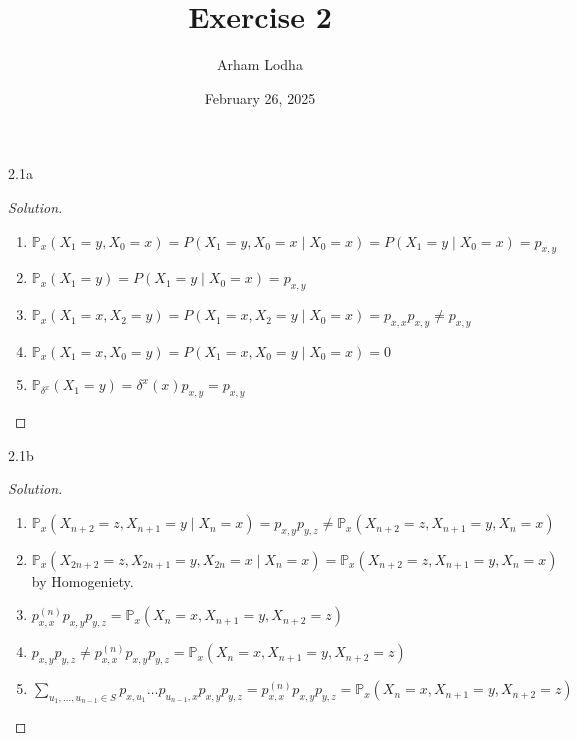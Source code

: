 \documentclass{article}
\newcommand{\PR}{\mathbb{P}}
\newenvironment{solution}
{\renewcommand\qedsymbol{$\blacksquare$}\begin{proof}[Solution]}
{\end{proof}}
\begin{document}
\title{Exercise 2}
\author{Arham Lodha}%
\date{February 26, 2025}%
\maketitle

\begin{PROB}{2.1a}\label{Problem 2.1a.}
\end{PROB}
\begin{solution}
    \begin{enumerate}
        \item $\PR_x(X_1 = y, X_0 = x) = P(X_1 = y, X_0 = x \mid X_0 = x) = P(X_1 = y \mid X_0 = x) = p_{x, y}$
        \item $\PR_x(X_1 = y) = P(X_1 = y \mid X_0 = x) = p_{x, y}$
        \item $\PR_x(X_1 = x, X_2 = y) = P(X_1 = x, X_2 =y \mid X_0 = x) = p_{x, x} p_{x, y} \neq p_{x, y}$
        \item $\PR_{x}(X_1 = x, X_0 = y) = P(X_1 = x, X_0 = y \mid X_0 = x) = 0$
        \item $\PR_{\delta^x}(X_1 = y) = \delta^x(x) p_{x, y} = p_{x, y}$ 
    \end{enumerate}
    
    
\end{solution}
\begin{PROB}{2.1b}\label{Problem 2.1b.}
\end{PROB}
\begin{solution}
    \begin{enumerate}
        \item $\PR_x(X_{n + 2} = z , X_{n + 1}= y \mid X_n = x) = p_{x, y} p_{y, z} \neq \PR_x(X_{n + 2} = z, X_{n + 1} = y, X_{n} = x)$ 
        \item $\PR_x(X_{2n + 2} = z, X_{2n + 1} = y, X_{2n} = x \mid X_{n} = x) = \PR_x(X_{n + 2} = z, X_{n + 1} = y, X_{n} = x)$ by Homogeniety. 
        \item $p^{(n)}_{x, x}p_{x, y}p_{y, z} = \PR_x(X_n = x, X_{n + 1} = y, X_{n + 2}= z)$
        \item $p_{x, y} p_{y, z} \neq p^{(n)}_{x, x}p_{x, y}p_{y, z} = \PR_x(X_n = x, X_{n + 1} = y, X_{n + 2}= z)$ 
        \item $\sum_{u_1, \dots, u_{n - 1} \in S} p_{x, u_1}\dots p_{u_{n - 1}, x} p_{x, y} p_{y,z} = p^{(n)}_{x, x}p_{x, y}p_{y, z} = \PR_x(X_n = x, X_{n + 1} = y, X_{n + 2}= z)$  
    \end{enumerate}
    
\end{solution}
\end{document}
